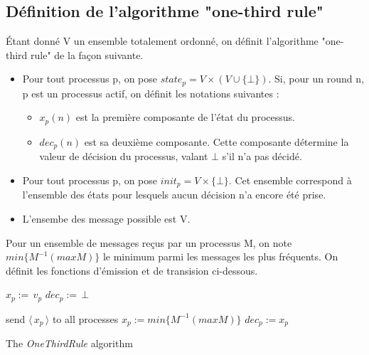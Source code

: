 \documentclass{article}
\begin{document}
\subsection{Définition de l'algorithme "one-third rule"}

Étant donné V un ensemble totalement ordonné, on définit l'algorithme "one-third rule" de la façon suivante.
\begin{itemize}
	\item Pour tout processus p, on pose $state_p = V \times (V \cup \{ \bot \})$.
	Si, pour un round n, p est un processus actif, on définit les notations suivantes :
	\begin{itemize}

		\item $x_p(n)$ est la première composante de l'état du processus.
		\item $dec_p(n)$ est sa deuxième composante. Cette composante détermine la valeur de décision 
		du processus, valant $\bot$ s'il n'a pas décidé.

	\end{itemize}
\item Pour tout processus p, on pose $init_p = V \times \{ \bot \}$. Cet ensemble correspond à l'ensemble des états pour lesquels aucun décision n'a encore été prise.
\item L'ensembe des message possible est V. 
\end{itemize}
Pour un ensemble de messages reçus par un processus M, on note $min \{M^{-1} (max M)\}$  le minimum parmi les messages les plus fréquents.
On définit les fonctions d'émission et de transision ci-dessous.

\begin{algorithm}[htb]
\begin{distribalgo}[1]
\BLANK {}
  \STATE $x_p :=\, v_p$ 
  \STATE $dec_p :=\, \bot$ 

\ENDINDENT \BLANK

    \STATE send $\langle\, x_p\, \rangle$ to all processes
  \ENDINDENT
  \BLANK
	  \STATE $x_p := min \{M^{-1} (max M)\}$ 
		  \STATE $dec_p := x_p$ 
        \ENDIF
      \ENDIF
  \ENDINDENT
\ENDINDENT \BLANK


\caption{The {\em OneThirdRule} algorithm} \label{algo:R}
\end{distribalgo}

\end{algorithm}
\end{document}
